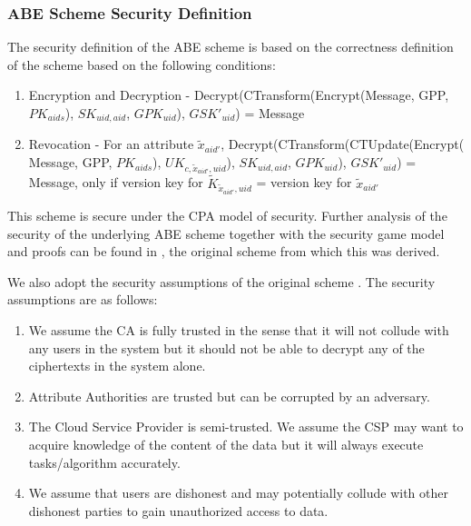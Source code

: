 \subsubsection*{ABE Scheme Security Definition}\label{secdef}

The security definition of the ABE scheme is based on the correctness definition of the scheme based on the following conditions:

\begin{enumerate}[label=(\arabic*)]
	\item Encryption and Decryption - Decrypt(CTransform(Encrypt(Message, GPP, $PK_{aids}$), $SK_{uid,aid}$, $GPK_{uid}$), $GSK'_{uid}$) = Message
	
	\item Revocation - For an attribute $\tilde{x}_{aid'}$, Decrypt(CTransform(CTUpdate(Encrypt(\\Message, GPP, $PK_{aids}$), ${UK}_{c,\tilde{x}_{aid'},uid}$), $SK_{uid,aid}$, $GPK_{uid}$), $GSK'_{uid}$) = Message, only if version key for $\tilde{K}_{\tilde{x}_{aid'},uid}$ = version key for $\tilde{x}_{aid'}$
\end{enumerate}

This scheme is secure under the CPA model of security. Further analysis of the security of the underlying ABE scheme together with the security game model and proofs can be found in \cite{Yang2014}, the original scheme from which this was derived.

We also adopt the security assumptions of the original  scheme \cite{Yang2014}. The security assumptions are as follows:

\begin{enumerate}[label=(\arabic*)]
	\item We assume the CA is fully trusted in the sense that it will not collude with any users in the system but it should not be able to decrypt any of the ciphertexts in the system alone.
	
	\item Attribute Authorities are trusted but can be corrupted by an adversary.
	
	\item The Cloud Service Provider is semi-trusted. We assume the CSP may want to acquire knowledge of the content of the data but it will always execute tasks/algorithm accurately.
	
	\item We assume that users are dishonest and may potentially collude with other dishonest parties to gain unauthorized access to data.
\end{enumerate}

